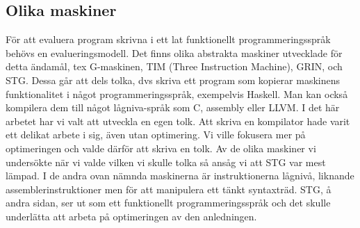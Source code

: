 \documentclass[../Core]{subfiles}
\begin{document}
\subsection{Olika maskiner}
För att evaluera program skrivna i ett lat funktionellt programmeringsspråk
behövs en evalueringsmodell. Det finns olika abstrakta maskiner utvecklade för 
detta ändamål, tex G-maskinen, TIM (Three Instruction Machine), GRIN, och STG.
Dessa går att dels tolka, dvs skriva ett program som kopierar maskinens
funktionalitet i något programmeringsspråk, exempelvis Haskell. Man kan också
kompilera dem till något lågniva-språk som C, assembly eller LLVM.
    I det här arbetet har vi valt att utveckla en egen tolk. Att skriva en
kompilator hade varit ett delikat arbete i sig, även utan optimering. Vi ville
fokusera mer på optimeringen och valde därför att skriva en tolk.
    Av de olika maskiner vi undersökte när vi valde vilken vi skulle tolka så
ansåg vi att STG var mest lämpad. I de andra ovan nämnda maskinerna är
instruktionerna lågnivå, liknande assemblerinstruktioner men för att manipulera
ett tänkt syntaxträd. STG, å andra sidan, ser ut som ett funktionellt
programmeringsspråk och det skulle underlätta att arbeta på optimeringen av
den anledningen.
\end{document}
